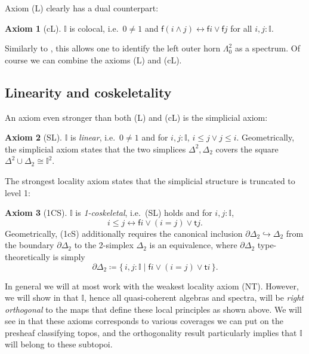 \documentclass[a4paper,12pt]{amsart}
\theoremstyle{definition}
\newtheorem*{axiom}{Axiom}
\newcommand{\mbb}[1]{\mathbb{#1}}
\newcommand{\I}{\mbb I}
\newcommand{\ms}[1]{\mathsf{#1}}
\newcommand{\scomp}[2]{\{\,#1\mid#2\,\}}
\newcommand{\hook}{\hookrightarrow}
\newcommand{\eq}{\leftrightarrow}
\begin{document}
Axiom (L) clearly has a dual counterpart:

\begin{axiom}[cL]\label{ax:cL}
  $\I$ is colocal, i.e.\ $0 \neq 1$ and $\ms f(i \wedge j) \eq \ms fi \vee \ms fj$ for all $i,j : \I$.
\end{axiom}

Similarly to , this allows one to identify the left outer horn $\Lambda^2_0$ as a spectrum. Of course we can combine the axioms (L) and (cL). 

\subsection{Linearity and coskeletality}

An axiom even stronger than both (L) and (cL) is the simplicial axiom:

\begin{axiom}[SL]\label{ax:SL}
  $\I$ is \emph{linear}, i.e.\ $0 \neq 1$ and for $i,j : \I$, $i \le j \vee j \le i$. Geometrically, the simplicial axiom states that the two simplices $\Delta^2,\Delta_2$ covers the square $\Delta^2 \cup \Delta_2 \cong \I^2$.
\end{axiom}

The strongest locality axiom states that the simplicial structure is truncated to level 1:

\begin{axiom}[1CS]\label{ax:1cS}
  $\I$ is \emph{1-coskeletal}, i.e.\ (SL) holds and for $i,j : \I$, 
  \[ i \le j \eq \ms fi \vee (i = j)\vee \ms tj. \]
  Geometrically, (1cS) additionally requires the canonical inclusion $\partial\Delta_2 \hook \Delta_2$ from the boundary $\partial\Delta_2$ to the 2-simplex $\Delta_2$ is an equivalence, where $\partial\Delta_2$ type-theoretically is simply
  \[ \partial\Delta_2 \coloneq \scomp{i,j : \I}{\ms fi \vee (i = j) \vee \ms ti}. \]
\end{axiom}

In general we will at most work with the weakest locality axiom (NT). However, we will show in  that $\I$, hence all quasi-coherent algebras and spectra, will be \emph{right orthogonal} to the maps that define these local principles as shown above. We will see in  that these axioms corresponds to various coverages we can put on the presheaf classifying topos, and the orthogonality result particularly implies that $\I$ will belong to these subtopoi.
\end{document}
